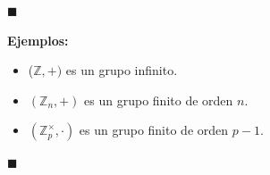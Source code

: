 \documentclass[10 pt]{article}
\begin{document}
\begin{flushright}
    $\blacksquare$
\end{flushright}

\Large{\textbf{Ejemplos:}} \\

\begin{itemize}
    \item \Large{($\mathbb Z,+)$ es un grupo infinito.} \\
    
    \item \Large{$(\mathbb Z_n,+)$ es un grupo finito de orden $n$.} \\
    
    \item \Large{$(\mathbb Z_p^{\times},\cdot)$ es un grupo finito de orden $p-1$.} \\
\end{itemize}

\begin{flushright}
$\blacksquare$
\end{flushright}
\end{document}
